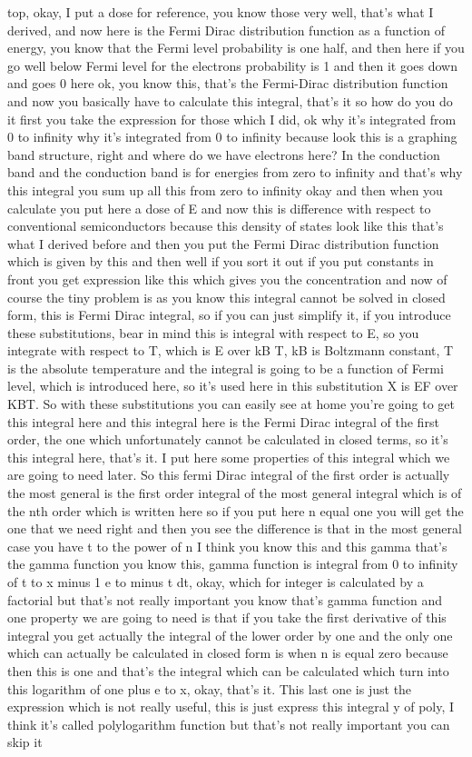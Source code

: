top, okay, I put a dose for reference, you know those very well, that's what I derived, and now here is the Fermi Dirac distribution function as a function of energy, you know that the Fermi level probability is one half, and then here if you go well below Fermi level for the electrons probability is 1 and then it goes down and goes 0 here ok, you know this, that's the Fermi-Dirac distribution function and now you basically have to calculate this integral, that's it so how do you do it first you take the expression for those which I did, ok why it's integrated from 0 to infinity why it's integrated from 0 to infinity because look this is a graphing band structure, right and where do we have electrons here? In the conduction band and the conduction band is for energies from zero to infinity and that's why this integral you sum up all this from zero to infinity okay and then when you calculate you put here a dose of E and now this is difference with respect to conventional semiconductors because this density of states look like this that's what I derived before and then you put the Fermi Dirac distribution function which is given by this and then well if you sort it out if you put constants in front you get expression like this which gives you the concentration and now of course the tiny problem is as you know this integral cannot be solved in closed form, this is Fermi Dirac integral, so if you can just simplify it, if you introduce these substitutions, bear in mind this is integral with respect to E, so you integrate with respect to T, which is E over kB T, kB is Boltzmann constant, T is the absolute temperature and the integral is going to be a function of Fermi level, which is introduced here, so it's used here in this substitution X is EF over KBT. So with these substitutions you can easily see at home you're going to get this integral here and this integral here is the Fermi Dirac integral of the first order, the one which unfortunately cannot be calculated in closed terms, so it's this integral here, that's it. I put here some properties of this integral which we are going to need later. So this fermi Dirac integral of the first order is actually the most general is the first order integral of the most general integral which is of the nth order which is written here so if you put here n equal one you will get the one that we need right and then you see the difference is that in the most general case you have t to the power of n I think you know this and this gamma that's the gamma function you know this, gamma function is integral from 0 to infinity of t to x minus 1 e to minus t dt, okay, which for integer is calculated by a factorial but that's not really important you know that's gamma function and one property we are going to need is that if you take the first derivative of this integral you get actually the integral of the lower order by one and the only one which can actually be calculated in closed form is when n is equal zero because then this is one and that's the integral which can be calculated which turn into this logarithm of one plus e to x, okay, that's it. This last one is just the expression which is not really useful, this is just express this integral y of poly, I think it's called polylogarithm function but that's not really important you can skip it 